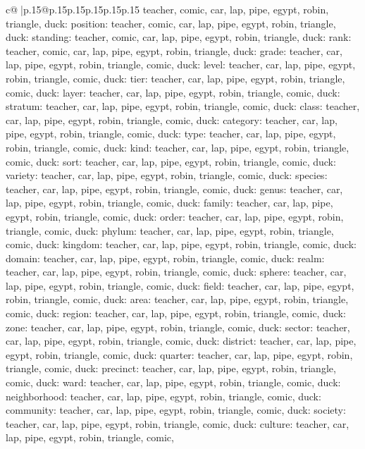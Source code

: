 \documentclass{article}
\begin{document}
{\begin{supertabular}{c@{$\;$}|p{.15\linewidth}@{}p{.15\linewidth}p{.15\linewidth}p{.15\linewidth}p{.15\linewidth}p{.15\linewidth}}
{{{teacher, comic, car, lap, pipe, egypt, robin, triangle, duck\n\nCLUE: position\nTARGETS: teacher, comic, car, lap, pipe, egypt, robin, triangle, duck\n\nCLUE: standing\nTARGETS: teacher, comic, car, lap, pipe, egypt, robin, triangle, duck\n\nCLUE: rank\nTARGETS: teacher, comic, car, lap, pipe, egypt, robin, triangle, duck\n\nCLUE: grade\nTARGETS: teacher, car, lap, pipe, egypt, robin, triangle, comic, duck\n\nCLUE: level\nTARGETS: teacher, car, lap, pipe, egypt, robin, triangle, comic, duck\n\nCLUE: tier\nTARGETS: teacher, car, lap, pipe, egypt, robin, triangle, comic, duck\n\nCLUE: layer\nTARGETS: teacher, car, lap, pipe, egypt, robin, triangle, comic, duck\n\nCLUE: stratum\nTARGETS: teacher, car, lap, pipe, egypt, robin, triangle, comic, duck\n\nCLUE: class\nTARGETS: teacher, car, lap, pipe, egypt, robin, triangle, comic, duck\n\nCLUE: category\nTARGETS: teacher, car, lap, pipe, egypt, robin, triangle, comic, duck\n\nCLUE: type\nTARGETS: teacher, car, lap, pipe, egypt, robin, triangle, comic, duck\n\nCLUE: kind\nTARGETS: teacher, car, lap, pipe, egypt, robin, triangle, comic, duck\n\nCLUE: sort\nTARGETS: teacher, car, lap, pipe, egypt, robin, triangle, comic, duck\n\nCLUE: variety\nTARGETS: teacher, car, lap, pipe, egypt, robin, triangle, comic, duck\n\nCLUE: species\nTARGETS: teacher, car, lap, pipe, egypt, robin, triangle, comic, duck\n\nCLUE: genus\nTARGETS: teacher, car, lap, pipe, egypt, robin, triangle, comic, duck\n\nCLUE: family\nTARGETS: teacher, car, lap, pipe, egypt, robin, triangle, comic, duck\n\nCLUE: order\nTARGETS: teacher, car, lap, pipe, egypt, robin, triangle, comic, duck\n\nCLUE: phylum\nTARGETS: teacher, car, lap, pipe, egypt, robin, triangle, comic, duck\n\nCLUE: kingdom\nTARGETS: teacher, car, lap, pipe, egypt, robin, triangle, comic, duck\n\nCLUE: domain\nTARGETS: teacher, car, lap, pipe, egypt, robin, triangle, comic, duck\n\nCLUE: realm\nTARGETS: teacher, car, lap, pipe, egypt, robin, triangle, comic, duck\n\nCLUE: sphere\nTARGETS: teacher, car, lap, pipe, egypt, robin, triangle, comic, duck\n\nCLUE: field\nTARGETS: teacher, car, lap, pipe, egypt, robin, triangle, comic, duck\n\nCLUE: area\nTARGETS: teacher, car, lap, pipe, egypt, robin, triangle, comic, duck\n\nCLUE: region\nTARGETS: teacher, car, lap, pipe, egypt, robin, triangle, comic, duck\n\nCLUE: zone\nTARGETS: teacher, car, lap, pipe, egypt, robin, triangle, comic, duck\n\nCLUE: sector\nTARGETS: teacher, car, lap, pipe, egypt, robin, triangle, comic, duck\n\nCLUE: district\nTARGETS: teacher, car, lap, pipe, egypt, robin, triangle, comic, duck\n\nCLUE: quarter\nTARGETS: teacher, car, lap, pipe, egypt, robin, triangle, comic, duck\n\nCLUE: precinct\nTARGETS: teacher, car, lap, pipe, egypt, robin, triangle, comic, duck\n\nCLUE: ward\nTARGETS: teacher, car, lap, pipe, egypt, robin, triangle, comic, duck\n\nCLUE: neighborhood\nTARGETS: teacher, car, lap, pipe, egypt, robin, triangle, comic, duck\n\nCLUE: community\nTARGETS: teacher, car, lap, pipe, egypt, robin, triangle, comic, duck\n\nCLUE: society\nTARGETS: teacher, car, lap, pipe, egypt, robin, triangle, comic, duck\n\nCLUE: culture\nTARGETS: teacher, car, lap, pipe, egypt, robin, triangle, comic, }}}
\end{supertabular}}
\end{document}
